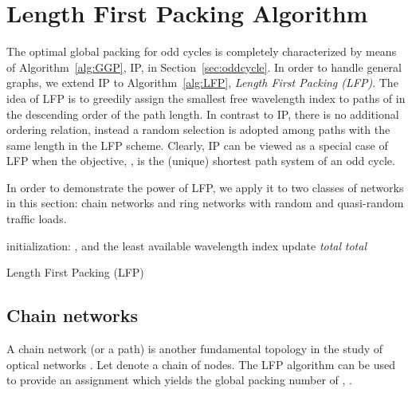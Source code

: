 \documentclass[journal,draftcls,onecolumn,12pt,twoside]{IEEEtran}
\begin{document}
\section{Length First Packing Algorithm}\label{sec:simulation}
The optimal global packing for odd cycles is completely characterized by means of Algorithm~\ref{alg:GGP}, IP, in Section~\ref{sec:oddcycle}.
In order to handle general graphs, we extend IP to Algorithm~\ref{alg:LFP}, \emph{Length First Packing (LFP)}.
The idea of LFP is to greedily assign the smallest free wavelength index to paths of  in the descending order of the path length.
In contrast to IP, there is no additional ordering relation, instead a random selection
is adopted among paths with the same length in the LFP scheme.
Clearly, IP can be viewed as a special case of LFP when the objective, , is the (unique) shortest path system of an odd cycle.

In order to demonstrate the power of LFP, we apply it to two classes of networks
in this section: chain networks and ring networks with random and quasi-random traffic
loads.

\begin{algorithm}\SetAlgoLined
  initialization: ,  and  \;
  \While{}
  {
    \For{}
 	{
 		\If{}
 		{
 		 the least available wavelength index\;
 		\;
 		}
 	}
 	update \emph{total} \;
    \;
  }
    \Return \emph{total}\;
  \caption{Length First Packing (LFP)}
  \label{alg:LFP}
\end{algorithm}

\subsection{Chain networks}
A chain network (or a path) is another fundamental topology in the study of optical networks \cite{Agbinya_06}.
Let  denote a chain of  nodes.
The LFP algorithm can be used to provide an assignment which yields
the global packing number of , .
\end{document}
